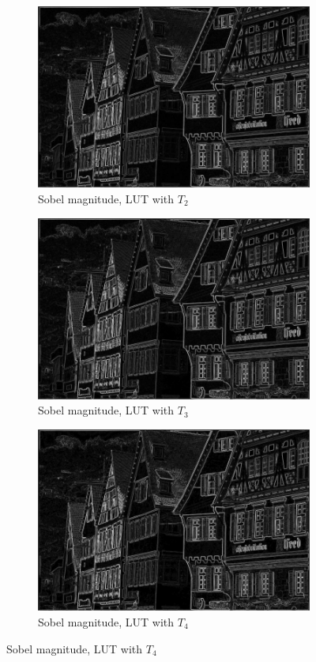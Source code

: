 \documentclass[12pt]{amsart}
\theoremstyle{definition}
\theoremstyle{remark}
\numberwithin{thm}{section}
\begin{document}
\begin{figure}[h]
\begin{subfigure}[b]{0.4\textwidth}
\end{subfigure}
\begin{subfigure}[b]{0.4\textwidth} \includegraphics[width=\textwidth]{german2.jpg} \caption{Sobel magnitude, LUT with $T_2$} \end{subfigure}
\begin{subfigure}[b]{0.4\textwidth} \includegraphics[width=\textwidth]{german3.jpg} \caption{Sobel magnitude, LUT with $T_3$} %
\end{subfigure}
\begin{subfigure}[b]{0.4\textwidth} \includegraphics[width=\textwidth]{german4.jpg} \caption{Sobel magnitude, LUT with $T_4$} \end{subfigure}


\end{figure}
\end{document}
